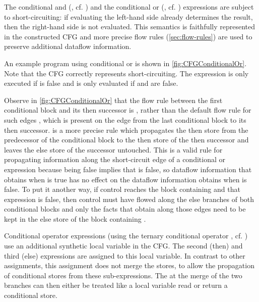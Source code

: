 The conditional and (\code{&&}, cf. ) and the
conditional or (\code{||}, cf. ) expressions are subject
to short-circuiting: if evaluating the left-hand side already
determines the result, then the right-hand side is not evaluated. This
semantics is faithfully represented in the constructed CFG and more
precise flow rules (\autoref{sec:flow-rules}) are used to preserve
additional dataflow information.

An example program using conditional or is shown in
\autoref{fig:CFGConditionalOr}.  Note that the CFG correctly
represents short-circuiting.  The expression  is only
executed if  is false and  is only evaluated if
 and  are false.

Observe in \autoref{fig:CFGConditionalOr} that the flow rule between
the first conditional block and its then successor is
, rather than the default flow rule for such edges
, which is present on the edge from the last
conditional block to its then successor.   is a
more precise rule which propagates the then store from the predecessor
of the conditional block to the then store of the then successor and
leaves the else store of the successor untouched.  This is a valid
rule for propagating information along the short-circuit edge of a
conditional or expression because  being false
implies that  is false, so dataflow information that obtains
when  is true has no effect on the dataflow information
obtains when  is false.  To put it another way,
if control reaches the block containing  and
that expression is false, then control must have flowed along the else
branches of both conditional blocks and only the facts that obtain
along those edges need to be kept in the else store of the block
containing .



Conditional operator expressions (using the ternary conditional operator
, cf. ) use an additional synthetic local
variable in the CFG. The second (then) and third (else) expressions are
assigned to this local variable. In contrast to other assignments, this
assignment does not merge the stores, to allow the propagation of
conditional stores from these sub-expressions.
The  at the merge of the two branches can
then either be treated like a local variable read or return a
conditional store.


